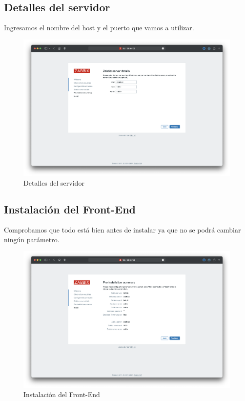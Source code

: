     \subsection{Detalles del servidor}
    Ingresamos el nombre del host y el puerto que vamos a utilizar.
    \begin{figure}[H]
        \centering
        \includegraphics[scale=0.25]{images/zabbix_installation_4.png}
        \caption{Detalles del servidor}
        \label{fig:zabbix_installation_4}
    \end{figure} 

    \subsection{Instalación del Front-End}
    Comprobamos que todo está bien antes de instalar ya que no se podrá cambiar ningún parámetro.
    \begin{figure}[H]
        \centering
        \includegraphics[scale=0.25]{images/zabbix_installation_5.png}
        \caption{Instalación del Front-End}
        \label{fig:zabbix_installation_5}
    \end{figure} 

